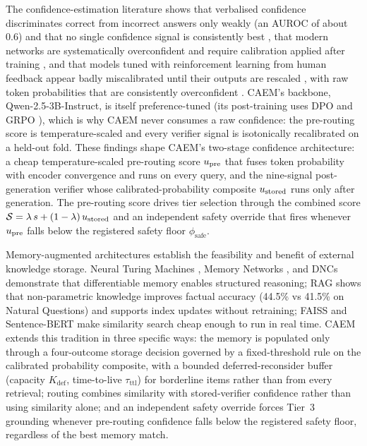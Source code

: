 The confidence-estimation literature shows that verbalised confidence discriminates correct from incorrect answers only weakly (an AUROC of about 0.6) and that no single confidence signal is consistently best \cite{xiong2023can}, that modern networks are systematically overconfident and require calibration applied after training \cite{pmlr-v70-guo17a}, and that models tuned with reinforcement learning from human feedback appear badly miscalibrated until their outputs are rescaled \cite{kadavath2022language}, with raw token probabilities that are consistently overconfident \cite{tian2023just}. CAEM's backbone, Qwen-2.5-3B-Instruct, is itself preference-tuned (its post-training uses DPO and GRPO \cite{qwen25}), which is why CAEM never consumes a raw confidence: the pre-routing score is temperature-scaled and every verifier signal is isotonically recalibrated on a held-out fold. These findings shape CAEM's two-stage confidence architecture: a cheap temperature-scaled pre-routing score $u_{\text{pre}}$ that fuses token probability with encoder convergence and runs on every query, and the nine-signal post-generation verifier whose calibrated-probability composite $u_{\text{stored}}$ runs only after generation. The pre-routing score drives tier selection through the combined score $\mathcal{S} = \lambda\,s + (1-\lambda)\,u_{\text{stored}}$ and an independent safety override that fires whenever $u_{\text{pre}}$ falls below the registered safety floor $\phi_{\text{safe}}$.

Memory-augmented architectures establish the feasibility and benefit of external knowledge storage. Neural Turing Machines \cite{graves2014neural}, Memory Networks \cite{weston2015memory}, and DNCs \cite{graves2016differentiable} demonstrate that differentiable memory enables structured reasoning; RAG \cite{NEURIPS2020_6b493230} shows that non-parametric knowledge improves factual accuracy (44.5\% vs 41.5\% on Natural Questions) and supports index updates without retraining; FAISS \cite{8733051} and Sentence-BERT \cite{reimers-gurevych-2019-sentence} make similarity search cheap enough to run in real time. CAEM extends this tradition in three specific ways: the memory is populated only through a four-outcome storage decision governed by a fixed-threshold rule on the calibrated probability composite, with a bounded deferred-reconsider buffer (capacity $K_{\text{def}}$, time-to-live $\tau_{\text{ttl}}$) for borderline items rather than from every retrieval; routing combines similarity with stored-verifier confidence rather than using similarity alone; and an independent safety override forces Tier~3 grounding whenever pre-routing confidence falls below the registered safety floor, regardless of the best memory match.

